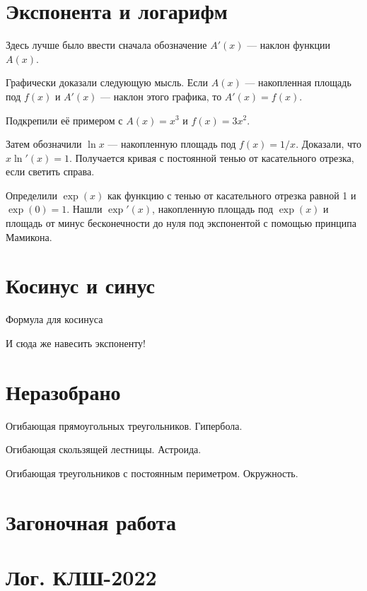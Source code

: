 \documentclass[12pt]{article}
\theoremstyle{definition}
\begin{document}
\section{Экспонента и логарифм}

Здесь лучше было ввести сначала обозначение $A'(x)$ — наклон функции $A(x)$. 

Графически доказали следующую мысль. 
Если $A(x)$ — накопленная площадь под $f(x)$ и $A'(x)$ — наклон этого графика, то $A'(x) = f(x)$.

Подкрепили её примером с $A(x) = x^3$ и $f(x) = 3x^2$. 

Затем обозначили $\ln x$ — накопленную площадь под $f(x) = 1/x$.
Доказали, что $x \ln'(x) = 1$. Получается кривая с постоянной тенью от касательного отрезка, если светить справа.

Определили $\exp(x)$ как функцию с тенью от касательного отрезка равной 1 и $\exp(0)=1$. 
Нашли $\exp'(x)$, накопленную площадь под $\exp(x)$ и площадь от минус бесконечности до нуля под экспонентой с помощью 
принципа Мамикона. 

\section{Косинус и синус}

Формула для косинуса

И сюда же навесить экспоненту!


\section{Неразобрано}






Огибающая прямоугольных треугольников. Гипербола.

Огибающая скользящей лестницы. Астроида.

Огибающая треугольников с постоянным периметром. Окружность.




\section{Загоночная работа}




\newpage

\section{Лог. КЛШ-2022}
\end{document}
